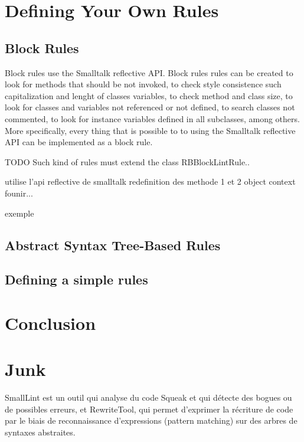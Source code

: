 \documentclass[a4paper,10pt,twoside]{book}
\begin{document}
\section{Defining Your Own Rules}

\subsection{Block Rules}

Block rules use the Smalltalk reflective API. Block rules rules can be created to look for methods that should be not invoked, to check style consistence such capitalization and lenght of classes variables, to check method and class size, to look for classes and variables not referenced or not defined, to search classes not commented, to look for instance variables defined in all subclasses, among others. More specifically, every thing that is possible to to using the Smalltalk reflective API can be implemented as a block rule.

TODO
Such kind of rules must extend the class RBBlockLintRule..

utilise l'api reflective de smalltalk
redefinition des methode 1 et 2
object context founir...

exemple

\subsection{Abstract Syntax Tree-Based Rules}

\subsection{Defining a simple rules}

\section{Conclusion}







\section{Junk}

SmallLint est un outil qui analyse du code Squeak et qui
d\'etecte des bogues ou de possibles erreurs, et RewriteTool, qui permet
d'exprimer la r\'ecriture de code par le biais de reconnaissance
d'expressions (pattern matching) sur des arbres de syntaxes
abstraites. 
\end{document}
